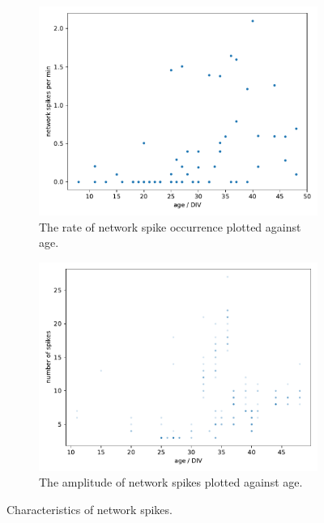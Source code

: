 \documentclass[10pt]{article}
\begin{document}
\begin{figure}
\centering
\begin{subfigure}[b]{0.7\textwidth}
	\centering
	\includegraphics[width=\textwidth]{../plots/network_spikes_age.pdf}
	\caption{The rate of network spike occurrence plotted against age.}
	\label{fig:networkfreq}
\end{subfigure}

\begin{subfigure}[b]{0.7\textwidth}
	\centering
	\includegraphics[width=\textwidth]{../plots/network_spikes_amplitude.pdf}
	\caption{The amplitude of network spikes plotted against age.}
	\label{fig:networkamp}
\end{subfigure}
\caption{Characteristics of network spikes.}
\end{figure}
\end{document}

